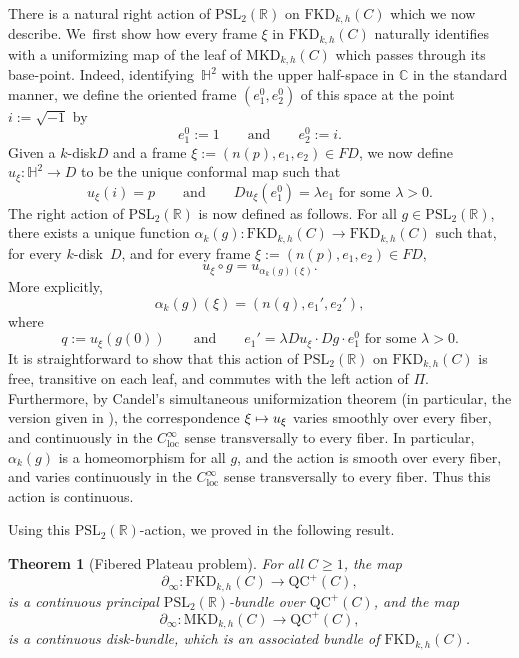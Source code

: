 \documentclass[11pt]{article}
\newcommand\mto{\mathchoice{\longmapsto}{\mapsto}{\mapsto}{\mapsto}}
\newcommand{\kdisk}{$k$\nobreakdash-disk\xspace}
\theoremstyle{plain}
\newtheorem{theorem}{Theorem}[section]
\theoremstyle{definition}
\newcommand\PSL{\mathrm{PSL}_2(\mathbb{R})}
\newcommand\Hd{\mathbb{H}^2}
\newcommand{\C}{{\mathbb C}}
\newcommand{\loc}{\mathrm{loc}}
\newcommand{\QC}{\mathrm{QC}}
\newcommand{\MKD}{\mathrm{MKD}}
\newcommand{\FKD}{\mathrm{FKD}}
\newcommand{\bord}{\partial_{\infty}}
\begin{document}
There is a natural right action of $\PSL$ on $\FKD_{k,h}(C)$ which we now describe. We~first show how every frame $\xi$ in $\FKD_{k,h}(C)$ naturally identifies with a uniformizing map of the leaf of $\MKD_{k,h}(C)$ which passes through its base-point. Indeed, identifying~$\Hd$ with the upper half-space in $\C$ in the standard manner, we define the oriented frame $(e_1^0,e_2^0)$ of this space at the point $i:=\sqrt{-1}$ by
\begin{equation*}
e_1^0 := 1\qquad\text{and}\qquad e_2^0 := i.
\end{equation*}
Given a \kdisk $D$ and a frame $\xi:=(n(p),e_1,e_2)\in FD$, we now define $u_\xi:\Hd\to D$ to be the unique conformal map such that
\begin{equation*}
u_\xi(i)=p\qquad\text{and}\qquad Du_\xi(e_1^0)=\lambda e_1\,\,\text{for some }\lambda>0.
\end{equation*}
The right action of $\PSL$ is now defined as follows. For all $g\in\PSL$, there exists a unique function $\alpha_k(g):\FKD_{k,h}(C)\to\FKD_{k,h}(C)$ such that, for every \kdisk~$D$, and for every frame $\xi:=(n(p),e_1,e_2)\in FD$,
\begin{equation*}
u_\xi\circ g = u_{\alpha_k(g)(\xi)}.
\end{equation*}
More explicitly,
\begin{equation*}
\alpha_k(g)(\xi) = (n(q),e_1',e_2'),
\end{equation*}
where
\begin{equation*}
q := u_\xi(g(0))\qquad\text{and}\qquad e_1'=\lambda Du_\xi\cdot Dg\cdot e_1^0\,\,\text{for some }\lambda>0.
\end{equation*}
It is straightforward to show that this action of $\PSL$ on $\FKD_{k,h}(C)$ is free, transitive on each leaf, and commutes with the left action of $\Pi$. Furthermore, by Candel's simultaneous uniformization theorem (in particular, the version given in \cite[Th.\,2.7]{AlvarezSmith}), the correspondence $\xi\mto u_\xi$ varies smoothly over every fiber, and continuously in the $C^\infty_\loc$ sense transversally to every fiber. In particular, $\alpha_k(g)$ is a homeomorphism for all $g$, and the action is smooth over every fiber, and varies continuously in the $C^\infty_\loc$ sense transversally to every fiber. Thus this action is continuous.

Using this $\PSL$-action, we proved in \cite[Th.\,3.1.2. \& 3.2.2]{ALS} the following result.

\begin{theorem}[Fibered Plateau problem]\label{t.fibered_PP}
For all $C\geq 1$, the map
\begin{equation*}
\bord :\FKD_{k,h}(C)\to\QC^+(C),
\end{equation*}
is a continuous principal $\PSL$-bundle over $\QC^+(C)$, and the map
\begin{equation*}
\bord :\MKD_{k,h}(C)\to\QC^+(C),
\end{equation*}
is a continuous disk-bundle, which is an associated bundle of $\FKD_{k,h}(C)$.
\end{theorem}
\end{document}
